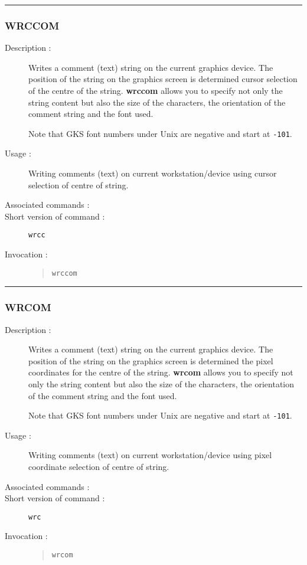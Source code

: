\hrule
\subsubsection*{\label{WRCCOM}WRCCOM}

\begin{description}

\item[Description :] Writes a comment (text) string on the current
graphics device.  The position of the string on the graphics screen is
determined cursor selection of the centre of the string.  {\bf wrccom}
allows you to specify not only the string content but also the size of
the characters, the orientation of the comment string and the font
used.

Note that GKS font numbers under Unix are negative and start at {\tt -101}.

\item[Usage :] Writing comments (text) on current workstation/device using
cursor selection of centre of string.
\item[Associated commands :] {\tt {}}
\item[Short version of command :] {\tt wrcc}
\item[Invocation :]

\begin{quote}{\tt  wrccom }\end{quote}

\end{description}

\hrule
\subsubsection*{\label{WRCOM}WRCOM}

\begin{description}

\item[Description :] Writes a comment (text) string on the current
graphics device. The position of the string on the graphics screen is
determined the pixel coordinates for the centre of the string.  {\bf
wrcom} allows you to specify not only the string content but also the
size of the characters, the orientation of the comment string and the
font used.

Note that GKS font numbers under Unix are negative and start at {\tt -101}.

\item[Usage :] Writing comments (text) on current workstation/device
using pixel coordinate selection of centre of string.

\item[Associated commands :] {\tt {}}
\item[Short version of command :] {\tt wrc}
\item[Invocation :]

\begin{quote}{\tt  wrcom }\end{quote}

\end{description}

